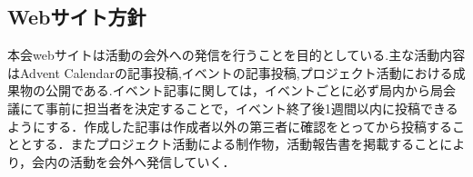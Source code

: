 \subsection*{Webサイト方針}


本会webサイトは活動の会外への発信を行うことを目的としている.主な活動内容はAdvent Calendarの記事投稿,イベントの記事投稿,プロジェクト活動における成果物の公開である.イベント記事に関しては，イベントごとに必ず局内から局会議にて事前に担当者を決定することで，イベント終了後1週間以内に投稿できるようにする．作成した記事は作成者以外の第三者に確認をとってから投稿することとする．またプロジェクト活動による制作物，活動報告書を掲載することにより，会内の活動を会外へ発信していく．

